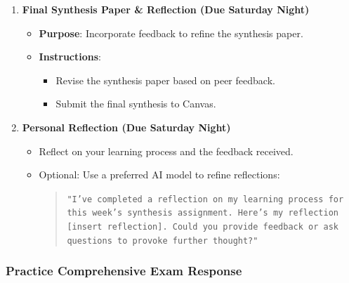 \documentclass[12pt, letterpaper]{article}
\begin{document}
\begin{enumerate}
    \item \textbf{Final Synthesis Paper \& Reflection (Due Saturday Night)}
    \begin{itemize}
        \item \textbf{Purpose}: Incorporate feedback to refine the synthesis paper.
        \item \textbf{Instructions}:
        \begin{itemize}
            \item Revise the synthesis paper based on peer feedback.
            \item Submit the final synthesis to Canvas.
        \end{itemize}
    \end{itemize}

    \item \textbf{Personal Reflection (Due Saturday Night)}
            \begin{itemize}
                \item Reflect on your learning process and the feedback received.
                \item Optional: Use a preferred AI model to refine reflections:
                \begin{quote}
                    \texttt{"I've completed a reflection on my learning process for this week's synthesis assignment. Here's my reflection [insert reflection]. Could you provide feedback or ask questions to provoke further thought?"}
                \end{quote}
            \end{itemize}
\end{enumerate}

\subsubsection*{Practice Comprehensive Exam Response}
\end{document}
